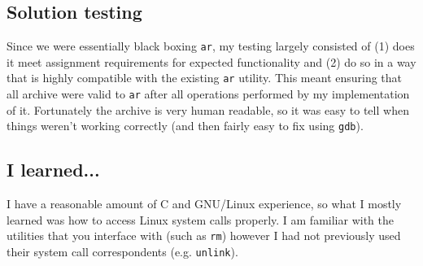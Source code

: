 \documentclass[letterpaper,10pt,titlepage]{article}
\begin{document}
\subsection{Solution testing}
Since we were essentially black boxing \verb~ar~, my testing largely consisted of
(1) does it meet assignment requirements for expected functionality and (2) do
so in a way that is highly compatible with the existing \verb~ar~ utility. This meant
ensuring that all archive were valid to \verb~ar~ after all operations performed by
my implementation of it. Fortunately the archive is very human readable, so it
was easy to tell when things weren't working correctly (and then fairly easy to fix
using \verb~gdb~).

\subsection{I learned...}
I have a reasonable amount of C and GNU/Linux experience, so what I mostly learned
was how to access Linux system calls properly. I am familiar with the utilities
that you interface with (such as \verb~rm~) however I had not previously used
their system call correspondents (e.g. \verb~unlink~).
\end{document}
